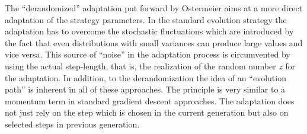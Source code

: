 The ``derandomized'' adaptation put forward by Ostermeier
\cite{Ostermeier:92,Ostermeier:94} aims at a more direct adaptation of
the strategy parameters. In the standard evolution strategy the
adaptation has to overcome the stochastic fluctuations which are
introduced by the fact that even distributions with small variances
can produce large values and vice versa. This source of ``noise'' in
the adaptation process is circumvented by using the actual
step-length, that is, the realization of the random number $z$ for the
adaptation. In addition, to the derandomization the idea of an
``evolution path'' is inherent in all of these approaches. The
principle is very similar to a momentum term in standard gradient
descent approaches. The adaptation does not just rely on the step
which is chosen in the current generation but also on selected steps
in previous generation.


